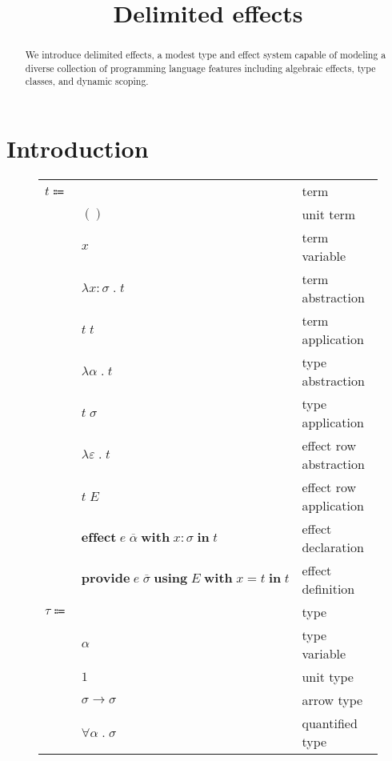 \documentclass[12pt]{article}
\title{Delimited effects}
\date{}
\newcommand\lstof[1]{\overline{#1}}
\newcommand\eterm{t}
\newcommand\eunit{()}
\newcommand\evar{x}
\newcommand\eabs[2]{\lambda #1 \; . \; #2} %
\newcommand\eapp[2]{#1 \; #2}
\newcommand\etabs[2]{\lambda #1 \; . \; #2} %
\newcommand\exabs[2]{\lambda #1 \; . \; #2} %
\newcommand\etapp[2]{#1 \; #2}
\newcommand\exapp[2]{#1 \; #2}
\newcommand\eeffect[4]{\textbf{effect} \; #1 \; \textbf{with} \; \tanno{#2}{#3} \; \textbf{in} \; #4}
\newcommand\eprovide[5]{\textbf{provide} \; #1 \; \textbf{using} \; #2 \; \textbf{with} \; #3 = #4 \; \textbf{in} \; #5}
\newcommand\ttype{\tau}
\newcommand\tvar{\alpha}
\newcommand\tunit{1}
\newcommand\tarrow[2]{#1 \rightarrow #2} %
\newcommand\ttforall[2]{\forall #1 \; . \; #2} %
\newcommand\tx{\sigma}
\newcommand\tanno[2]{#1 : #2} %
\newcommand\xeffects{E}
\newcommand\xvar{\varepsilon}
\newcommand\xtapp[2]{#1 \; \lstof{#2}}
\newcommand\xeffect{e}
\begin{document}
  \maketitle

  \begin{abstract}
    We introduce delimited effects, a modest type and effect system capable of modeling a diverse collection of programming language features including algebraic effects, type classes, and dynamic scoping.
  \end{abstract}

  \section{Introduction}

  \begin{figure}
    \begin{mdframed}[backgroundcolor=none]
      \begin{center}
        \begin{tabular}{l l l}
          $\eterm \Coloneqq $ & & term \\
          & $\eunit$ & unit term \\
          & $\evar$ & term variable \\
          & $\eabs{\tanno{\evar}{\tx}}{\eterm}$ & term abstraction \\
          & $\eapp{\eterm}{\eterm}$ & term application \\
          & $\etabs{\tvar}{\eterm}$ & type abstraction \\
          & $\etapp{\eterm}{\tx}$ & type application \\
          & $\exabs{\xvar}{\eterm}$ & effect row abstraction \\
          & $\exapp{\eterm}{\xeffects}$ & effect row application \\
          & $\eeffect{\xtapp{\xeffect}{\tvar}}{\evar}{\tx}{\eterm}$ & effect declaration \\
          & $\eprovide{\xtapp{\xeffect}{\tx}}{\xeffects}{\evar}{\eterm}{\eterm}$ & effect definition \\
          $\ttype \Coloneqq$ & & type \\
          & $\tvar$ & type variable \\
          & $\tunit$ & unit type \\
          & $\tarrow{\tx}{\tx}$ & arrow type \\
          & $\ttforall{\tvar}{\tx}$ & quantified type \\

\end{tabular}
\end{center}
\end{mdframed}
\end{figure}
\end{document}
